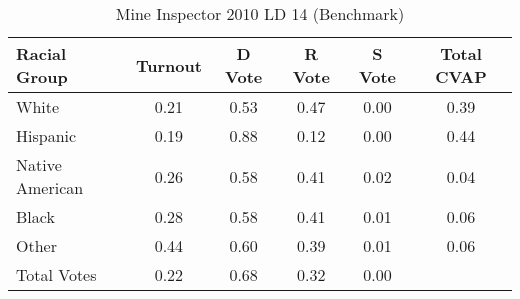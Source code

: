 \begin{table}[htb]
\begin{center}
\caption{Mine Inspector 2010 LD 14 (Benchmark)}
\label{smine_cvap_ld_14_benchmark}
\begin{tabular}{lccccc}
  \hline
Racial Group & Turnout & D Vote & R Vote & S Vote & Total CVAP \\ 
  \hline
White & 0.21 & 0.53 & 0.47 & 0.00 & 0.39 \\ 
  Hispanic & 0.19 & 0.88 & 0.12 & 0.00 & 0.44 \\ 
  Native American & 0.26 & 0.58 & 0.41 & 0.02 & 0.04 \\ 
  Black & 0.28 & 0.58 & 0.41 & 0.01 & 0.06 \\ 
  Other & 0.44 & 0.60 & 0.39 & 0.01 & 0.06 \\ 
  Total Votes & 0.22 & 0.68 & 0.32 & 0.00 &  \\ 
   \hline
\end{tabular}
\end{center}
\end{table}
